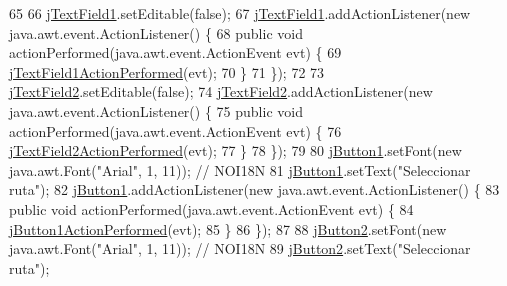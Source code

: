 \begin{DoxyCode}
65 
66         \mbox{\hyperlink{classactualizadordoxy_1_1ventana_principal_a0e2df794c32f58c41675cd579e38b5d0}{jTextField1}}.setEditable(\textcolor{keyword}{false});
67         \mbox{\hyperlink{classactualizadordoxy_1_1ventana_principal_a0e2df794c32f58c41675cd579e38b5d0}{jTextField1}}.addActionListener(\textcolor{keyword}{new} java.awt.event.ActionListener() \{
68             \textcolor{keyword}{public} \textcolor{keywordtype}{void} actionPerformed(java.awt.event.ActionEvent evt) \{
69                 \mbox{\hyperlink{classactualizadordoxy_1_1ventana_principal_a07a6f5c9a19788d19f2e92d3d4ae9942}{jTextField1ActionPerformed}}(evt);
70             \}
71         \});
72 
73         \mbox{\hyperlink{classactualizadordoxy_1_1ventana_principal_a8e245eb8ef04c878fffa2f029094c142}{jTextField2}}.setEditable(\textcolor{keyword}{false});
74         \mbox{\hyperlink{classactualizadordoxy_1_1ventana_principal_a8e245eb8ef04c878fffa2f029094c142}{jTextField2}}.addActionListener(\textcolor{keyword}{new} java.awt.event.ActionListener() \{
75             \textcolor{keyword}{public} \textcolor{keywordtype}{void} actionPerformed(java.awt.event.ActionEvent evt) \{
76                 \mbox{\hyperlink{classactualizadordoxy_1_1ventana_principal_a1a0fec6296ff00cf7f39be7a58e37e3c}{jTextField2ActionPerformed}}(evt);
77             \}
78         \});
79 
80         \mbox{\hyperlink{classactualizadordoxy_1_1ventana_principal_a9e234f123e4d11dcd43f19051065a6bd}{jButton1}}.setFont(\textcolor{keyword}{new} java.awt.Font(\textcolor{stringliteral}{"Arial"}, 1, 11)); \textcolor{comment}{// NOI18N}
81         \mbox{\hyperlink{classactualizadordoxy_1_1ventana_principal_a9e234f123e4d11dcd43f19051065a6bd}{jButton1}}.setText(\textcolor{stringliteral}{"Seleccionar ruta"});
82         \mbox{\hyperlink{classactualizadordoxy_1_1ventana_principal_a9e234f123e4d11dcd43f19051065a6bd}{jButton1}}.addActionListener(\textcolor{keyword}{new} java.awt.event.ActionListener() \{
83             \textcolor{keyword}{public} \textcolor{keywordtype}{void} actionPerformed(java.awt.event.ActionEvent evt) \{
84                 \mbox{\hyperlink{classactualizadordoxy_1_1ventana_principal_aa309a47bf4e80a45c18c516ec13f8c64}{jButton1ActionPerformed}}(evt);
85             \}
86         \});
87 
88         \mbox{\hyperlink{classactualizadordoxy_1_1ventana_principal_a2cf13d88ffb8e10bbc41bf5d690bd6fe}{jButton2}}.setFont(\textcolor{keyword}{new} java.awt.Font(\textcolor{stringliteral}{"Arial"}, 1, 11)); \textcolor{comment}{// NOI18N}
89         \mbox{\hyperlink{classactualizadordoxy_1_1ventana_principal_a2cf13d88ffb8e10bbc41bf5d690bd6fe}{jButton2}}.setText(\textcolor{stringliteral}{"Seleccionar ruta"});

\end{DoxyCode}
